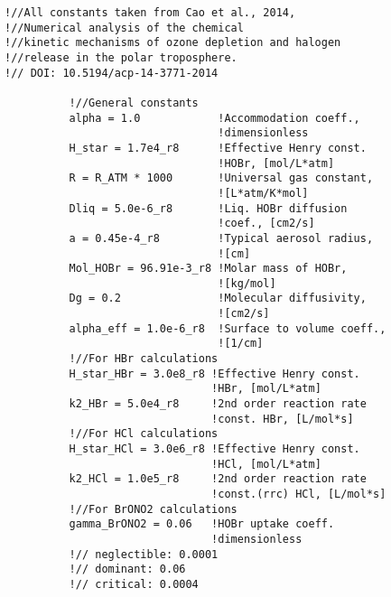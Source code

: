 \begin{lstlisting}
!//All constants taken from Cao et al., 2014, 
!//Numerical analysis of the chemical
!//kinetic mechanisms of ozone depletion and halogen 
!//release in the polar troposphere.
!// DOI: 10.5194/acp-14-3771-2014

          !//General constants
          alpha = 1.0            !Accommodation coeff., 
                                 !dimensionless
          H_star = 1.7e4_r8      !Effective Henry const. 
                                 !HOBr, [mol/L*atm]
          R = R_ATM * 1000       !Universal gas constant, 
                                 ![L*atm/K*mol] 
          Dliq = 5.0e-6_r8       !Liq. HOBr diffusion 
                                 !coef., [cm2/s]
          a = 0.45e-4_r8         !Typical aerosol radius, 
                                 ![cm]
          Mol_HOBr = 96.91e-3_r8 !Molar mass of HOBr, 
                                 ![kg/mol]
          Dg = 0.2               !Molecular diffusivity, 
                                 ![cm2/s]
          alpha_eff = 1.0e-6_r8  !Surface to volume coeff., 
                                 ![1/cm]
          !//For HBr calculations
          H_star_HBr = 3.0e8_r8 !Effective Henry const.  
                                !HBr, [mol/L*atm]
          k2_HBr = 5.0e4_r8     !2nd order reaction rate 
                                !const. HBr, [L/mol*s]
          !//For HCl calculations
          H_star_HCl = 3.0e6_r8 !Effective Henry const. 
                                !HCl, [mol/L*atm]
          k2_HCl = 1.0e5_r8     !2nd order reaction rate 
                                !const.(rrc) HCl, [L/mol*s]
          !//For BrONO2 calculations
          gamma_BrONO2 = 0.06   !HOBr uptake coeff. 
                                !dimensionless
          !// neglectible: 0.0001 
          !// dominant: 0.06
          !// critical: 0.0004
          

\end{lstlisting}
